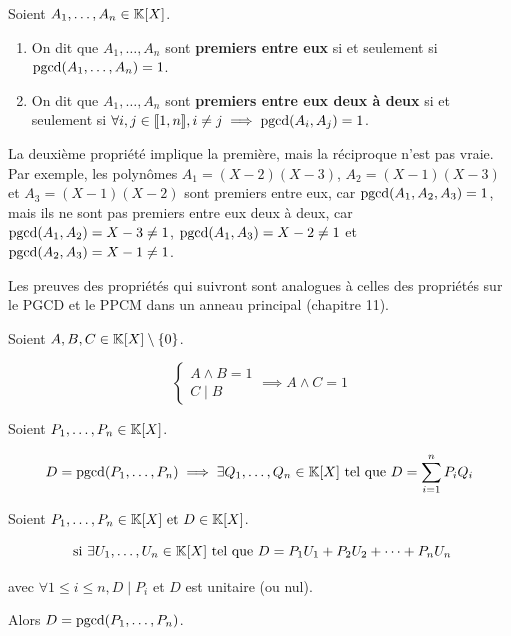\documentclass[12pt, a4paper]{report}
\begin{document}
\begin{definition}
    Soient $A_1, \dots, A_n \in \mathbb{K}[X]$.

    \begin{enumerate}
        \item On dit que $A_1, \dots, A_n$ sont \textbf{premiers entre eux} si et seulement si $\mathrm{pgcd}(A_1, \dots, A_n) = 1$.
        \item On dit que $A_1, \dots, A_n$ sont \textbf{premiers entre eux deux à deux} si et seulement si $\forall i,j \in [\![1,n]\!], i \ne j \implies \mathrm{pgcd}(A_i, A_j) = 1$.
    \end{enumerate}
\end{definition}

\begin{remark}
    La deuxième propriété implique la première, mais la réciproque n'est pas vraie. Par exemple, les polynômes $A_1 = (X-2)(X-3)$, $A_2 = (X-1)(X-3)$ et $A_3 = (X-1)(X-2)$ sont premiers entre eux, car $\mathrm{pgcd}(A_1, A_2, A_3) = 1$, mais ils ne sont pas premiers entre eux deux à deux, car $\mathrm{pgcd}(A_1, A_2) = X-3 \ne 1$, $\mathrm{pgcd}(A_1, A_3) = X-2 \ne 1$ et $\mathrm{pgcd}(A_2, A_3) = X-1 \ne 1$.
\end{remark}

\begin{importantbox}
    Les preuves des propriétés qui suivront sont analogues à celles des propriétés sur le PGCD et le PPCM dans un anneau principal (chapitre 11).
\end{importantbox}

\begin{property}
    Soient $A,B,C \in \mathbb{K}[X] \setminus \{0\}$.

    $$\begin{cases}
    A \wedge B = 1\\
    C \mid B
    \end{cases}
    \implies A \wedge C = 1$$
\end{property}

\begin{theorem}
    Soient $P_1,\dots,P_n \in \mathbb{K}[X]$.

    $$D = \mathrm{pgcd}(P_1,\dots,P_n) \implies \exists Q_1, \dots, Q_n \in \mathbb{K}[X] \text{ tel que } D = \sum_{i=1}^{n}P_iQ_i$$
\end{theorem}

\begin{property}
    Soient $P_1,\dots,P_n \in \mathbb{K}[X] \text{ et } D \in \mathbb{K}[X]$.

    $$\text{ si } \exists U_1,\dots,U_n \in \mathbb{K}[X] \text{ tel que } D = P_1U_1 + P_2U_2 + \cdots + P_nU_n$$

    avec $\forall 1 \le i \le n, D \mid P_i$ et $D$ est unitaire (ou nul).

    Alors $D = \mathrm{pgcd}(P_1,\dots,P_n)$.
\end{property}
\end{document}

